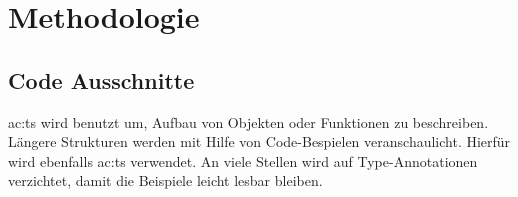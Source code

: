 \chapter{Methodologie}



\section{Code Ausschnitte}



\acrlong{ac:ts} wird benutzt um, Aufbau von Objekten oder Funktionen zu beschreiben. Längere Strukturen werden mit Hilfe von Code-Bespielen veranschaulicht. Hierfür wird ebenfalls \acrlong{ac:ts} verwendet. An viele Stellen wird auf Type-Annotationen verzichtet, damit die Beispiele leicht lesbar bleiben.